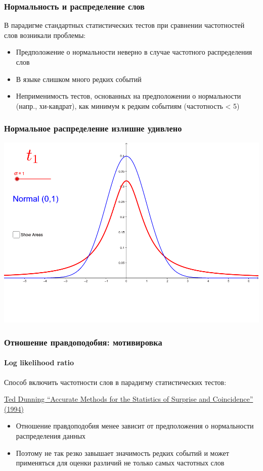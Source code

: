 \documentclass[svgnames]{beamer}
\begin{document}
\begin{frame}
  \frametitle{Нормальность и распределение слов}
  В парадигме стандартных статистических тестов при сравнении
  частотностей слов возникали проблемы:
  \begin{itemize}
  \item Предположение о нормальности неверно в случае частотного
    распределения слов
  \item В языке слишком много редких событий
  \item Неприменимость тестов, основанных на предположении о
    нормальности (напр., хи-кавдрат), как минимум к редким событиям (частотность < 5)
  \end{itemize}
\end{frame}

\begin{frame}
  \frametitle{Нормальное распределение излишне удивлено}
  \centering
  \includegraphics[width=\textwidth]{normal-student}
\end{frame}

\begin{frame}
  \frametitle{Отношение правдоподобия: мотивировка}
  \framesubtitle{Log likelihood ratio}
  Способ включить частотности слов в парадигму статистических тестов:

  \href{https://aclanthology.org/J93-1003.pdf}{Ted Dunning “Accurate
    Methods for the Statistics of Surprise and Coincidence” (1994)}
  \begin{itemize}
  \item Отношение правдоподобия менее зависит от предположения о
    нормальности распределения данных
  \item Поэтому не так резко завышает значимость редких событий и
    может применяться для оценки различий не только самых частотных слов
  \end{itemize}
\end{frame}
\end{document}
